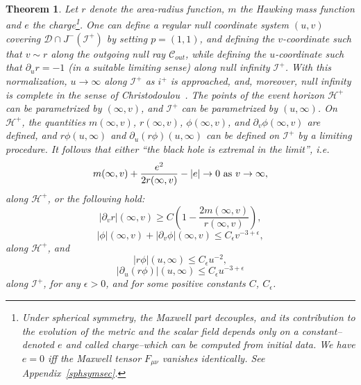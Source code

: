 \documentclass{article}
\newtheorem{theorem}{Theorem}[section]
\begin{document}
\begin{theorem}
\noindent
Let $r$ denote the area-radius function, $m$ the Hawking mass function
and $e$ the charge\footnote{Under spherical symmetry,
the Maxwell part decouples, and its contribution
to the evolution of the metric and the scalar field depends only on
a constant--denoted $e$ and called \emph{charge}--which can be 
computed from initial data. We have $e=0$ iff the 
Maxwell tensor $F_{\mu\nu}$ vanishes identically. See Appendix~\ref{sphsymsec}.}.
One can define a regular null coordinate 
system $(u,v)$ covering $\mathcal{D}\cap J^{-}(\mathcal{I}^+)$ 
by setting $p=(1,1)$, and
defining the $v$-coordinate such that $v\sim r$ along the outgoing null
ray
$\mathcal{C}_{out}$, while
defining the $u$-coordinate such that $\partial_ur=-1$
(in a suitable limiting sense) along null infinity $\mathcal{I}^+$. 
With this normalization, $u\to\infty$ along $\mathcal{I}^+$ as $i^+$ is approached,
and, moreover, null infinity is complete in the sense of 
Christodoulou~\cite{chr:mg}. The points of the event horizon
$\mathcal{H}^+$ can be parametrized by $(\infty,v)$, and 
$\mathcal{I}^+$ can be parametrized by $(u,\infty)$. 
On $\mathcal{H}^+$, the quantities $m(\infty,v)$, $r(\infty,v)$, $\phi(\infty,v)$,
and $\partial_v\phi(\infty,v)$ are defined, and
$r\phi(u,\infty)$ and $\partial_u(r\phi)(u,\infty)$ can be defined
on $\mathcal{I}^+$ by a limiting procedure. 
It follows that either ``the black hole is extremal in the limit'', i.e.
\begin{equation}
\label{kritiknp}
m(\infty,v)+\frac{e^2}{2r(\infty,v)}-|e|\to0\hbox{\rm\ as\ }v\to\infty,
\end{equation}
along $\mathcal{H}^+$,
or the following hold:
\begin{equation}
\label{kavovikopoinsn}
|\partial_v r|(\infty,v)\ge C\left(1-\frac{2m(\infty,v)}{r(\infty,v)}\right),
\end{equation}
\begin{equation}
\label{eisa-1}
|\phi|(\infty,v)+|\partial_v\phi|(\infty,v)\le C_\epsilon v^{-3+\epsilon},
\end{equation}
along $\mathcal{H}^+$,
and
\begin{equation}
\label{eisa-2}
|r\phi|(u,\infty)\le C_\epsilon u^{-2},
\end{equation}
\begin{equation}
\label{eisa-3}
|\partial_u{(r\phi)}|(u,\infty)\le C_\epsilon u^{-3+\epsilon}
\end{equation}
along $\mathcal{I}^+$, 
for any $\epsilon>0$, and for some positive constants $C$, $C_\epsilon$.
\end{theorem}
\end{document}
